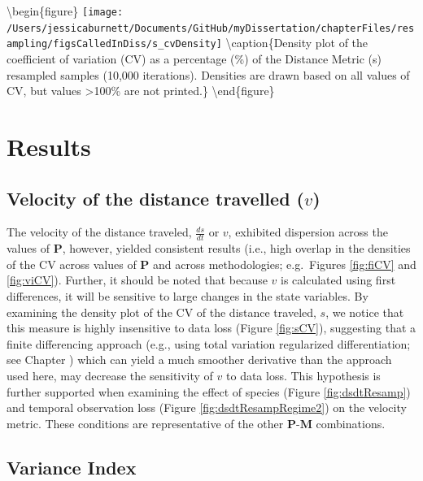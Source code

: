 \documentclass[12pt,twoside,openany]{reedthesis}
\begin{document}
\textbackslash begin\{figure\}
\texttt{[image: /Users/jessicaburnett/Documents/GitHub/myDissertation/chapterFiles/resampling/figsCalledInDiss/s\_cvDensity]} \textbackslash caption\{Density plot of the coefficient of variation (CV) as a percentage (\%) of the Distance Metric (s) resampled samples (10,000 iterations). Densities are drawn based on all values of CV, but values \textgreater100\% are not printed.\}\label{fig:sCV}
\textbackslash end\{figure\}

\hypertarget{results-2}{%
\section{Results}\label{results-2}}

\hypertarget{velocity-of-the-distance-travelled-v}{%
\subsection{\texorpdfstring{Velocity of the distance travelled (\(v\))}{Velocity of the distance travelled (v)}}\label{velocity-of-the-distance-travelled-v}}

The velocity of the distance traveled, \(\frac{ds}{dt}\) or \(v\), exhibited dispersion across the values of \(\textbf{P}\), however, yielded consistent results (i.e., high overlap in the densities of the CV across values of \(\textbf{P}\) and across methodologies; e.g.~Figures \ref{fig:fiCV} and \ref{fig:viCV}). Further, it should be noted that because \(v\) is calculated using first differences, it will be sensitive to large changes in the state variables. By examining the density plot of the CV of the distance traveled, \(s\), we notice that this measure is highly insensitive to data loss (Figure \ref{fig:sCV}), suggesting that a finite differencing approach (e.g., using total variation regularized differentiation; see Chapter ) which can yield a much smoother derivative than the approach used here, may decrease the sensitivity of \(v\) to data loss. This hypothesis is further supported when examining the effect of species (Figure \ref{fig:dsdtResamp}) and temporal observation loss (Figure \ref{fig:dsdtResampRegime2}) on the velocity metric. These conditions are representative of the other \(\textbf{P}\)-\(\textbf{M}\) combinations.

\hypertarget{variance-index}{%
\subsection{Variance Index}\label{variance-index}}
\end{document}
